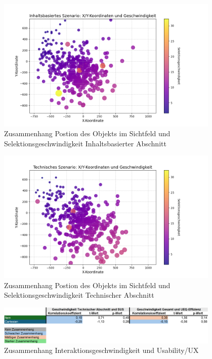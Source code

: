    \begin{figure}[tbh]
    \centering
   \includegraphics[width=0.95\textwidth]{images/Results/bubbleplot-inhalt.png}
    \caption{Zusammenhang Postion des Objekts im Sichtfeld und Selektionsgeschwindigkeit Inhaltsbasierter Abschnitt}
    \label{fig:bubbleKorrPosGeschwindigkeitInhalt}
   \end{figure}

   \begin{figure}[tbh]
    \centering
   \includegraphics[width=0.95\textwidth]{images/Results/bubbleplot-technisch.png}
    \caption{Zusammenhang Postion des Objekts im Sichtfeld und Selektionsgeschwindigkeit Technischer Abschnitt}
    \label{fig:bubbleKorrPosGeschwindigkeitTechnisch}
   \end{figure}

   \begin{figure}[tbh]
    \centering
   \includegraphics[width=0.95\textwidth]{images/Results/Korrelationen-Rest.png}
    \caption{Zusammenhang Interaktionsgeschwindigkeit und Usability/UX}
    \label{fig:TableKorrelationen}
   \end{figure}

